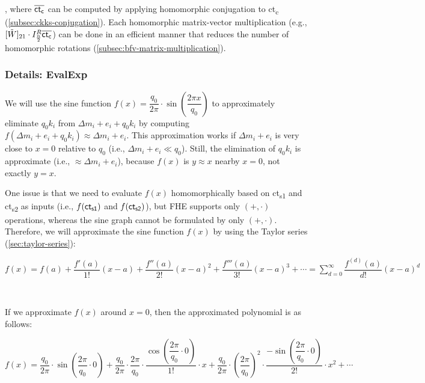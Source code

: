 , where $\mathit{\overline{\textsf{ct\textsubscript{c}}}}$ can be computed by applying homomorphic conjugation to \textsf{ct\textsubscript{c}} (\autoref{subsec:ckks-conjugation}). Each homomorphic matrix-vector multiplication (e.g., $[\tilde W]_{21} \cdot I^R_{\frac{n}{2}}\overline{\textsf{ct\textsubscript{c}}}$) can be done in an efficient manner that reduces the number of homomorphic rotations (\autoref{subsec:bfv-matrix-multiplication}). 



\subsubsection{Details: \textsf{EvalExp}}
\label{subsubsec:ckks-bootstrapping-evalexp-details}

We will use the sine function $f(x) = \dfrac{q_0}{2\pi}\cdot \sin\left(\dfrac{2\pi x}{q_0}\right)$ to approximately eliminate $q_0k_i$ from $\Delta m_i + e_i + q_0k_i$ by computing $f(\Delta m_i + e_i + q_0k_i) \approx \Delta m_i + e_i$. This approximation works if $\Delta m_i + e_i$ is very close to $x=0$ relative to $q_0$ (i.e., $\Delta m_i + e_i \ll q_0$). Still, the elimination of $q_0k_i$ is approximate (i.e., $\approx \Delta m_i + e_i$), because $f(x)$ is $y \approx x$ nearby $x=0$, not exactly $y = x$. 

One issue is that we need to evaluate $f(x)$ homomorphically based on \textsf{ct\textsubscript{s1}} and \textsf{ct\textsubscript{s2}} as inputs (i.e., $f(\textsf{ct\textsubscript{s1}})$ and $f(\textsf{ct\textsubscript{s2}})$), but FHE supports only $(+, \cdot)$ operations, whereas the sine graph cannot be formulated by only $(+, \cdot)$. Therefore, we will approximate the sine function $f(x)$ by using the Taylor series (\autoref{sec:taylor-series}): 

$f(x) = f(a) + \dfrac{f'(a)}{1!}(x-a) + \dfrac{f''(a)}{2!}(x-a)^2 + \dfrac{f'''(a)}{3!}(x-a)^3 + \cdots = \sum\limits_{d=0}^{\infty}\dfrac{f^{(d)}(a)}{d!}(x-a)^d$ 

$ $

If we approximate $f(x)$ around $x = 0$, then the approximated polynomial is as follows: 

$f(x) = \dfrac{q_0}{2\pi}\cdot \sin\left(\dfrac{2\pi}{q_0}\cdot 0\right) + \dfrac{q_0}{2\pi}\cdot\dfrac{2\pi}{q_0}\cdot\dfrac{\cos\left(\dfrac{2\pi}{q_0} \cdot 0\right)}{1!}\cdot x + \dfrac{q_0}{2\pi}\cdot \left(\dfrac{2\pi}{q_0}\right)^{2}\cdot\dfrac{-\sin\left(\dfrac{2\pi}{q_0} \cdot 0\right)}{2!}\cdot x^2 + \cdots$


